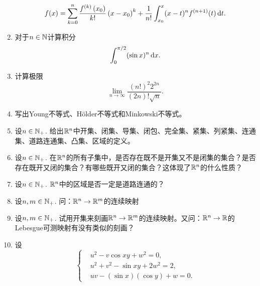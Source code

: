 \begin{enumerate}
\begin{equation*}
        f(x)=\sum_{k=0}^{n}\frac{f^{(k)}\left(x_0\right)}{k!}\left(x-x_0\right)^k+\frac{1}{n!}\int_{x_0}^x (x-t)^n f^{(n+1)}(t)\mathop{}\!\mathrm{d} t.
    \end{equation*}
    \item 对于$n\in \mathbb{N}$计算积分\begin{equation*}
        \int_0^{\pi/2}(\sin x)^n\mathop{}\!\mathrm{d} x.
    \end{equation*}
    \item 计算极限\begin{equation*}
        \lim_{n\to \infty}\frac{(n!)^2 2^{2n}}{(2n)!\sqrt{n}}.
    \end{equation*}
    \item 写出Young不等式、H\"older不等式和Minkowski不等式。
    \item 设$n\in\mathbb{N_+}$. 给出$\mathbb{R}^n$中开集、闭集、导集、闭包、完全集、紧集、列紧集、连通集、道路连通集、凸集、区域的定义。
    \item 设$n\in\mathbb{N_+}$. 在$\mathbb{R}^n$的所有子集中，是否存在既不是开集又不是闭集的集合？是否存在既开又闭的集合？有哪些既开又闭的集合？这体现了$\mathbb{R}^n$的什么性质？
    \item 设$n\in\mathbb{N_+}$. $\mathbb{R}^n$中的区域是否一定是道路连通的？
    \item 设$n,m\in\mathbb{N_+}$. 问：$\mathbb{R}^n\to\mathbb{R}^m$的连续映射\\
    \item 设$n,m\in\mathbb{N_+}$. 试用开集来刻画$\mathbb{R}^n\to\mathbb{R}^m$的连续映射。又问：$\mathbb{R}^n\to\mathbb{R}$的Lebesgue可测映射有没有类似的刻画？
    \item 设\begin{equation*}
        \left\{\begin{aligned}
            &u^2-v\cos xy+w^2=0,\\
            &u^2+v^2-\sin xy+2w^2=2,\\
            &uv-(\sin x)(\cos y)+w=0.

\end{aligned}
\end{equation*}
\end{enumerate}
